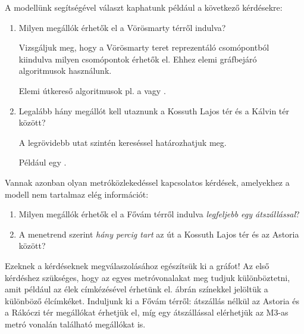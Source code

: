A modellünk segítségével választ kaphatunk például a következő kérdésekre:

\begin{enumerate}
	\item Milyen megállók érhetők el a Vörösmarty térről indulva?
	
		Vizsgáljuk meg, hogy a Vörösmarty teret reprezentáló csomópontból kiindulva milyen csomópontok érhetők el. Ehhez elemi gráfbejáró algoritmusok használunk.
		
		\begin{megjegyzes}
			Elemi útkereső algoritmusok pl. a  vagy .
		\end{megjegyzes}
	\item Legalább hány megállót kell utaznunk a Kossuth Lajos tér és a Kálvin tér között?

		A legrövidebb utat szintén kereséssel határozhatjuk meg.
		
		\begin{megjegyzes}
			Például egy \fogalomragozva{BFS}{szélességi kereséssel}.
		\end{megjegyzes}

\end{enumerate}

Vannak azonban olyan metróközlekedéssel kapcsolatos kérdések, amelyekhez a modell nem tartalmaz elég információt:

\begin{enumerate}
	\item Milyen megállók érhetők el a Fővám térről indulva \emph{legfeljebb egy átszállással}?
	\item A menetrend szerint \emph{hány percig tart} az út a Kossuth Lajos tér és az Astoria között?
\end{enumerate}

Ezeknek a kérdéseknek megválaszolásához egészítsük ki a gráfot! Az első kérdéshez szükséges, hogy az egyes metróvonalakat meg tudjuk különböztetni, amit például az élek címkézésével érhetünk el.  ábrán színekkel jelöltük a különböző élcímkéket. Induljunk ki a Fővám térről: átszállás nélkül az Astoria és a Rákóczi tér megállókat érhetjük el, míg egy átszállással elérhetjük az M3-as metró vonalán található megállókat is.


